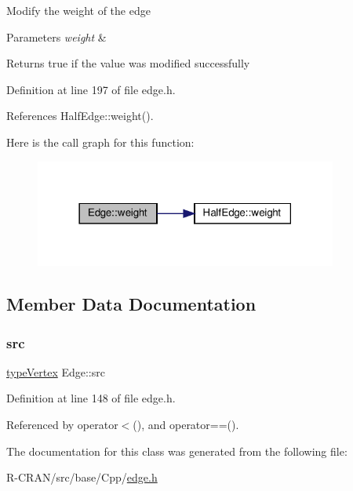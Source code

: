 Modify the weight of the edge 
\begin{DoxyParams}{Parameters}
{\em weight} & \\
\hline
\end{DoxyParams}
\begin{DoxyReturn}{Returns}
true if the value was modified successfully 
\end{DoxyReturn}


Definition at line 197 of file edge.\+h.



References Half\+Edge\+::weight().

Here is the call graph for this function\+:
\nopagebreak
\begin{figure}[H]
\begin{center}
\leavevmode
\includegraphics[width=282pt]{classEdge_abaf02f474e1cdc61f3baf06875b4f38c_cgraph}
\end{center}
\end{figure}


\subsection{Member Data Documentation}
\mbox{\label{classEdge_ac5a2d838052e08bc14c4741465f690e6}} 
\subsubsection{\texorpdfstring{src}{src}}
{\footnotesize\ttfamily \hyperlink{edge_8h_a5fbd20c46956d479cb10afc9855223f6}{type\+Vertex} Edge\+::src\hspace{0.3cm}{\ttfamily [private]}}



Definition at line 148 of file edge.\+h.



Referenced by operator$<$(), and operator==().



The documentation for this class was generated from the following file\+:\begin{DoxyCompactItemize}
\item 
R-\/\+C\+R\+A\+N/src/base/\+Cpp/\hyperlink{edge_8h}{edge.\+h}\end{DoxyCompactItemize}
